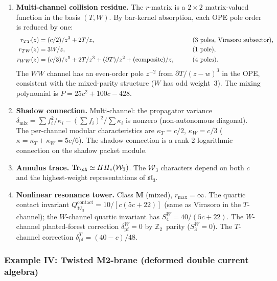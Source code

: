 \begin{computation}
\begin{enumerate}[label=\textup{(\roman*)},nosep]
\item \textbf{Multi-channel collision residue.}
 The $r$-matrix is a $2 \times 2$ matrix-valued function
 in the basis $(T, W)$.
 By bar-kernel absorption, each OPE pole order is reduced by one:
 \begin{alignat}{2}\label{eq:platonic-r-W3}
 r_{TT}(z) &= (c/2)/z^3 + 2T/z,
 &\qquad&\text{(3 poles, Virasoro subsector),}
 \notag\\
 r_{TW}(z) &= 3W/z,
 &&\text{(1 pole),}
 \notag\\
 r_{WW}(z) &= (c/3)/z^5 + 2T/z^3 + (\partial T)/z^2
 + (\text{composite})/z,
 &&\text{(4 poles).}
 \end{alignat}
 The $WW$ channel has an even-order pole $z^{-2}$ from
 $\partial T/(z-w)^3$ in the OPE, consistent with the
 mixed-parity structure ($W$ has odd weight~$3$).
 The mixing polynomial is $P = 25c^2 + 100c - 428$.

\item \textbf{Shadow connection.}
 Multi-channel: the propagator variance
 $\delta_{\mathrm{mix}} = \sum f_i^2/\kappa_i - (\sum f_i)^2/\sum\kappa_i$
 is nonzero (non-autonomous diagonal). The per-channel
 modular characteristics are
 $\kappa_T = c/2$, $\kappa_W = c/3$
 \textup{(}$\kappa = \kappa_T + \kappa_W = 5c/6$\textup{)}.
 The shadow connection is a rank-$2$ logarithmic connection on
 the shadow packet module.

\item \textbf{Annulus trace.}
 $\mathrm{Tr}_\cA \simeq HH_*(\mathcal{W}_3)$.
 The $\mathcal{W}_3$ characters depend on both $c$ and the
 highest-weight representations of $\mathfrak{sl}_3$.

\item \textbf{Nonlinear resonance tower.}
 Class $\mathbf{M}$ (mixed), $r_{\max} = \infty$.
 The quartic contact invariant
 $Q^{\mathrm{contact}}_{\mathcal{W}_3} = 10/[c(5c+22)]$
 \textup{(}same as Virasoro in the $T$-channel\textup{)};
 the $W$-channel quartic invariant has
 $S_4^W = 40/(5c+22)$.
 The $W$-channel planted-forest correction
 $\delta_{\mathrm{pf}}^W = 0$ by
 $\mathbb{Z}_2$~parity ($S_3^W = 0$).
 The $T$-channel correction
 $\delta_{\mathrm{pf}}^T = (40 - c)/48$.
\end{enumerate}
\end{computation}


\subsubsection{Example IV: Twisted M2-brane (deformed double current algebra)}
\label{subsubsec:platonic-M2}


